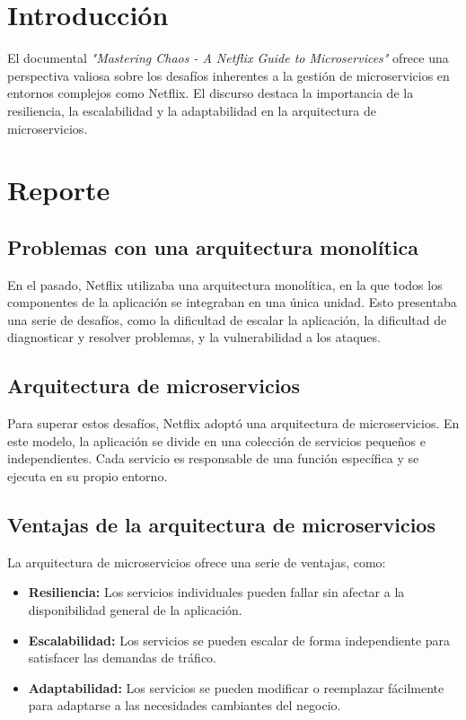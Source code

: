 \documentclass{dense_template}
\begin{document}
\maketitle
\tableofcontents
\newpage
\section{Introducción}
El documental \textit{"Mastering Chaos - A Netflix Guide to Microservices"} ofrece una perspectiva valiosa sobre los desafíos inherentes a la gestión de microservicios en entornos complejos como Netflix. El discurso destaca la importancia de la resiliencia, la escalabilidad y la adaptabilidad en la arquitectura de microservicios.

\section{Reporte}
\subsection{Problemas con una arquitectura monolítica}
En el pasado, Netflix utilizaba una arquitectura monolítica, en la que todos los componentes de la aplicación se integraban en una única unidad. Esto presentaba una serie de desafíos, como la dificultad de escalar la aplicación, la dificultad de diagnosticar y resolver problemas, y la vulnerabilidad a los ataques.

\subsection{Arquitectura de microservicios}
Para superar estos desafíos, Netflix adoptó una arquitectura de microservicios. En este modelo, la aplicación se divide en una colección de servicios pequeños e independientes. Cada servicio es responsable de una función específica y se ejecuta en su propio entorno.

\subsection{Ventajas de la arquitectura de microservicios}
La arquitectura de microservicios ofrece una serie de ventajas, como:

\begin{itemize}
    \item \textbf{Resiliencia:} Los servicios individuales pueden fallar sin afectar a la disponibilidad general de la aplicación.
    \item \textbf{Escalabilidad:} Los servicios se pueden escalar de forma independiente para satisfacer las demandas de tráfico.
    \item \textbf{Adaptabilidad:} Los servicios se pueden modificar o reemplazar fácilmente para adaptarse a las necesidades cambiantes del negocio.
\end{itemize}
\end{document}
